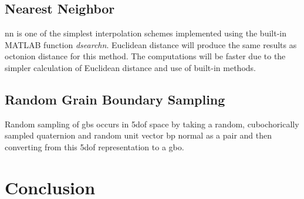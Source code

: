 \documentclass[preprint,12pt]{elsarticle}
\begin{document}
\subsection{Nearest Neighbor} \label{sec:methods:nn}

\Gls{nn} is one of the simplest interpolation schemes implemented using the built-in MATLAB function \textit{dsearchn}. Euclidean distance will produce the same results as octonion distance for this method. The computations will be faster due to the simpler calculation of Euclidean distance and use of built-in methods.

\subsection{Random Grain Boundary Sampling} \label{sec:methods:rand}

Random sampling of \glspl{gb} occurs in \gls{5dof} space by taking a random, cubochorically sampled quaternion and random unit vector \gls{bp} normal as a pair and then converting from this \gls{5dof} representation to a \gls{gbo}.

    
        
    


\section{Conclusion} \label{sec:conclusion}
\end{document}
